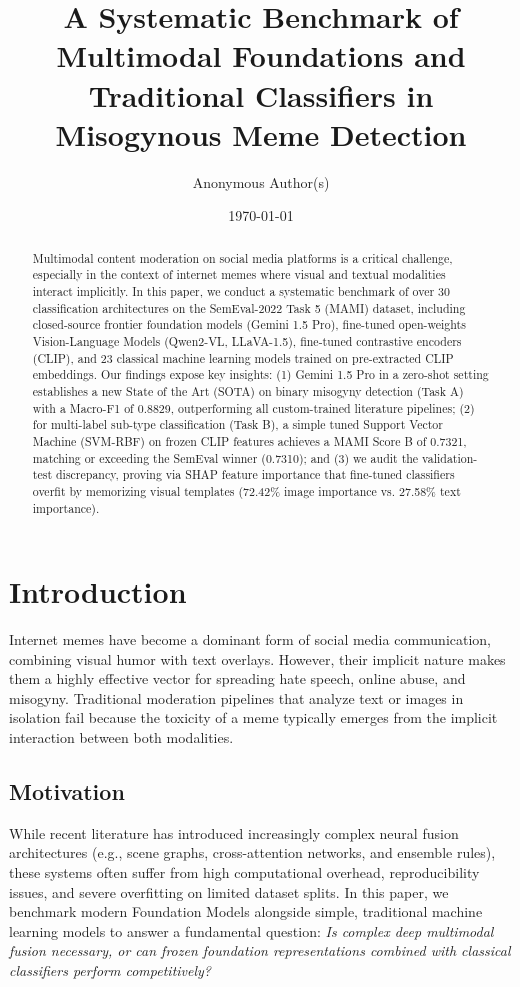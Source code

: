 \documentclass[11pt]{article}
\title{A Systematic Benchmark of Multimodal Foundations and Traditional Classifiers in Misogynous Meme Detection}
\author{Anonymous Author(s)}
\affil{Institution Placeholder}
\date{\today}
\begin{document}
\maketitle

\begin{abstract}
Multimodal content moderation on social media platforms is a critical challenge, especially in the context of internet memes where visual and textual modalities interact implicitly. In this paper, we conduct a systematic benchmark of over 30 classification architectures on the SemEval-2022 Task 5 (MAMI) dataset, including closed-source frontier foundation models (Gemini 1.5 Pro), fine-tuned open-weights Vision-Language Models (Qwen2-VL, LLaVA-1.5), fine-tuned contrastive encoders (CLIP), and 23 classical machine learning models trained on pre-extracted CLIP embeddings. Our findings expose key insights: (1) Gemini 1.5 Pro in a zero-shot setting establishes a new State of the Art (SOTA) on binary misogyny detection (Task A) with a Macro-F1 of 0.8829, outperforming all custom-trained literature pipelines; (2) for multi-label sub-type classification (Task B), a simple tuned Support Vector Machine (SVM-RBF) on frozen CLIP features achieves a MAMI Score B of 0.7321, matching or exceeding the SemEval winner (0.7310); and (3) we audit the validation-test discrepancy, proving via SHAP feature importance that fine-tuned classifiers overfit by memorizing visual templates (72.42\% image importance vs. 27.58\% text importance).
\end{abstract}

\section{Introduction}
\label{sec:intro}
Internet memes have become a dominant form of social media communication, combining visual humor with text overlays. However, their implicit nature makes them a highly effective vector for spreading hate speech, online abuse, and misogyny. Traditional moderation pipelines that analyze text or images in isolation fail because the toxicity of a meme typically emerges from the implicit interaction between both modalities.

\subsection{Motivation}
While recent literature has introduced increasingly complex neural fusion architectures (e.g., scene graphs, cross-attention networks, and ensemble rules), these systems often suffer from high computational overhead, reproducibility issues, and severe overfitting on limited dataset splits. In this paper, we benchmark modern Foundation Models alongside simple, traditional machine learning models to answer a fundamental question: \textit{Is complex deep multimodal fusion necessary, or can frozen foundation representations combined with classical classifiers perform competitively?}
\end{document}
